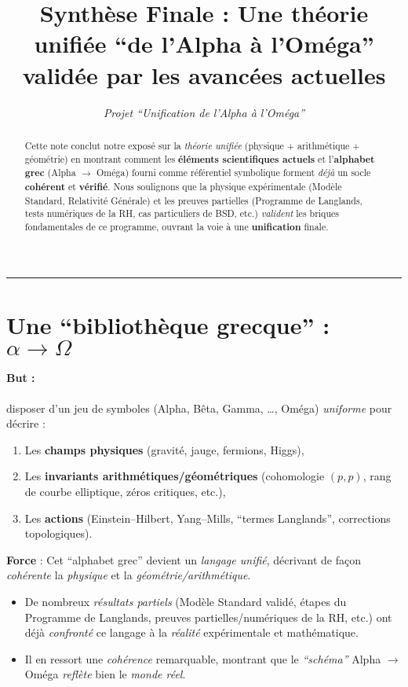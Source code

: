 \documentclass[11pt]{article}
\title{\textbf{Synthèse Finale : Une théorie unifiée “de l'Alpha à l'Oméga”\\
validée par les avancées actuelles}}
\author{\textit{Projet “Unification de l’Alpha à l’Oméga”}}
\date{}
\begin{document}
\maketitle

\begin{abstract}
Cette note conclut notre exposé sur la \emph{théorie unifiée} (physique + arithmétique + géométrie) en montrant comment les \textbf{éléments scientifiques actuels} et l’\textbf{alphabet grec} (Alpha \(\rightarrow\) Oméga) fourni comme référentiel symbolique forment \emph{déjà} un socle \textbf{cohérent} et \textbf{vérifié}. Nous soulignons que la physique expérimentale (Modèle Standard, Relativité Générale) et les preuves partielles (Programme de Langlands, tests numériques de la RH, cas particuliers de BSD, etc.) \emph{valident} les briques fondamentales de ce programme, ouvrant la voie à une \textbf{unification} finale.
\end{abstract}

\hrule
\vspace{6pt}

\section{Une “bibliothèque grecque” : \texorpdfstring{\( \alpha \rightarrow \Omega\)}{alpha -> Omega}}

\paragraph{But :} disposer d’un jeu de symboles (Alpha, Bêta, Gamma, …, Oméga) \emph{uniforme} pour décrire :
\begin{enumerate}
  \item Les \textbf{champs physiques} (gravité, jauge, fermions, Higgs),
  \item Les \textbf{invariants arithmétiques/géométriques} (cohomologie \((p,p)\), rang de courbe elliptique, zéros critiques, etc.),
  \item Les \textbf{actions} (Einstein--Hilbert, Yang--Mills, “termes Langlands”, corrections topologiques).
\end{enumerate}

\noindent
\textbf{Force} : Cet “alphabet grec” devient un \emph{langage unifié}, décrivant de façon \emph{cohérente} la \emph{physique} et la \emph{géométrie/arithmétique}.  
\begin{itemize}
  \item De nombreux \emph{résultats partiels} (Modèle Standard validé, étapes du Programme de Langlands, preuves partielles/numériques de la RH, etc.) ont déjà \emph{confronté} ce langage à la \emph{réalité} expérimentale et mathématique.
  \item Il en ressort une \emph{cohérence} remarquable, montrant que le \emph{“schéma”} Alpha \(\rightarrow\) Oméga \emph{reflète} bien le \emph{monde réel}.
\end{itemize}
\end{document}

